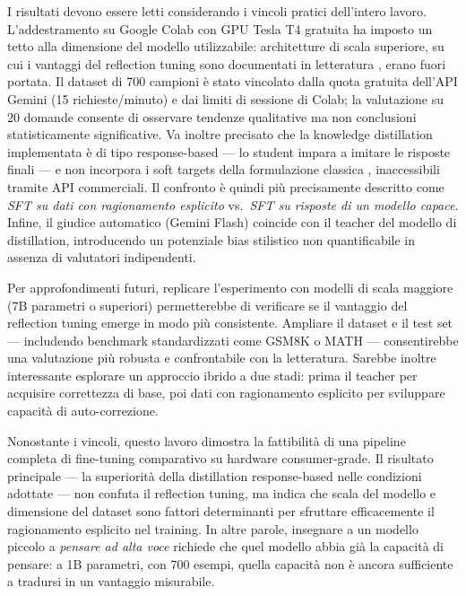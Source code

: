 I risultati devono essere letti considerando i vincoli pratici
dell'intero lavoro. L'addestramento su Google Colab con GPU Tesla T4
gratuita ha imposto un tetto alla dimensione del modello utilizzabile:
architetture di scala superiore, su cui i vantaggi del reflection
tuning sono documentati in letteratura \cite{deepseekr1_2025}, erano
fuori portata. Il dataset di 700 campioni è stato vincolato dalla quota
gratuita dell'API Gemini (15 richieste/minuto) e dai limiti di sessione
di Colab; la valutazione su 20 domande consente di osservare tendenze
qualitative ma non conclusioni statisticamente significative. Va inoltre
precisato che la knowledge distillation implementata è di tipo
response-based --- lo student impara a imitare le risposte finali ---
e non incorpora i soft targets della formulazione classica
\cite{hinton2015distilling}, inaccessibili tramite API commerciali.
Il confronto è quindi più precisamente descritto come \emph{SFT su
dati con ragionamento esplicito} vs.\ \emph{SFT su risposte di un
modello capace}. Infine, il giudice automatico (Gemini Flash) coincide
con il teacher del modello di distillation, introducendo un potenziale
bias stilistico non quantificabile in assenza di valutatori indipendenti.

Per approfondimenti futuri, replicare l'esperimento con modelli di
scala maggiore (7B parametri o superiori) permetterebbe di verificare
se il vantaggio del reflection tuning emerge in modo più consistente.
Ampliare il dataset e il test set --- includendo benchmark standardizzati
come GSM8K \cite{cobbe2021gsm8k} o MATH \cite{hendrycks2021math} ---
consentirebbe una valutazione più robusta e confrontabile con la
letteratura. Sarebbe inoltre interessante esplorare un approccio ibrido
a due stadi: prima il teacher per acquisire correttezza di base, poi
dati con ragionamento esplicito per sviluppare capacità di auto-correzione.

Nonostante i vincoli, questo lavoro dimostra la fattibilità di una
pipeline completa di fine-tuning comparativo su hardware consumer-grade.
Il risultato principale --- la superiorità della distillation
response-based nelle condizioni adottate --- non confuta il reflection
tuning, ma indica che scala del modello e dimensione del dataset sono
fattori determinanti per sfruttare efficacemente il ragionamento
esplicito nel training. In altre parole, insegnare a un modello piccolo
a \emph{pensare ad alta voce} richiede che quel modello abbia già la
capacità di pensare: a 1B parametri, con 700 esempi, quella capacità
non è ancora sufficiente a tradursi in un vantaggio misurabile.
